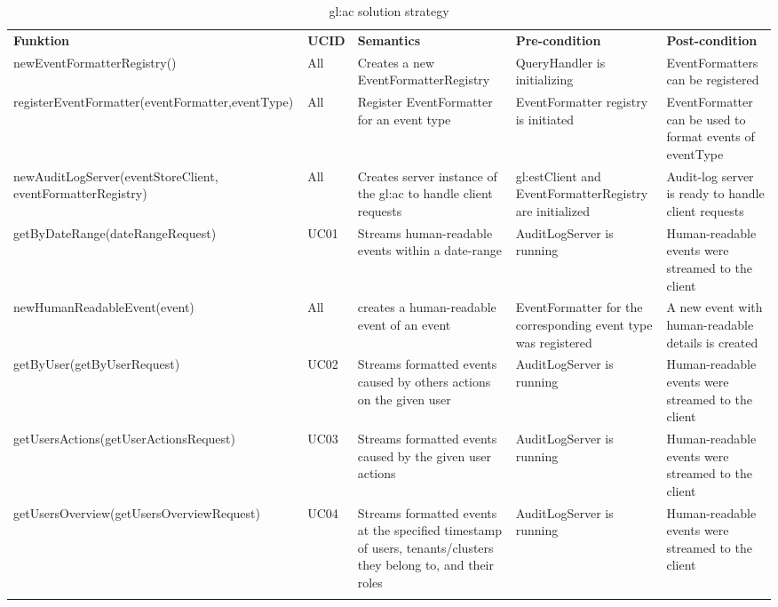 \def\arraystretch{1.5}
\begin{xltabular}[H]{\linewidth}{|X l X X X |}
  \hline
  \textbf{Funktion} & \textbf{UCID} & \textbf{Semantics} & \textbf{Pre-condition} & \textbf{Post-condition}\\
  
  new\-Event\-Formatter\-Registry\-() & All & Creates a new EventFormatterRegistry & QueryHandler is initializing & EventFormatters can be registered \\

  register\-Event\-Formatter(\-eventFormatter,\-eventType\-) & All & Register EventFormatter for an event type & EventFormatter registry is initiated & EventFormatter can be used to format events of eventType \\

  new\-Audit\-Log\-Server\-(event\-Store\-Client, event\-Formatter\-Registry) & All & Creates server instance of the \gls{gl:ac} to handle client requests & \gls{gl:est}Client and EventFormatterRegistry are initialized & Audit-log server is ready to handle client requests  \\

  get\-By\-Date\-Range(date\-Range\-Request) & UC01 & Streams human-readable events within a date-range & Audit\-Log\-Server is running & Human-readable events were streamed to the client  \\

  new\-Human\-Readable\-Event(\-event\-) & All & creates a human-readable event of an event & EventFormatter for the corresponding event type was registered & A new event with human-readable details is created \\

  get\-By\-User(get\-By\-User\-Request) & UC02 & Streams formatted events caused by others actions on the given user & Audit\-Log\-Server is running & Human-readable events were streamed to the client  \\

  get\-Users\-Actions(get\-User\-Actions\-Request) & UC03 & Streams formatted events caused by the given user actions & Audit\-Log\-Server is running & Human-readable events were streamed to the client  \\

  get\-Users\-Overview(get\-Users\-Overview\-Request) & UC04 & Streams formatted events at the specified timestamp of users, tenants/clusters they belong to, and their roles & Audit\-Log\-Server is running & Human-readable events were streamed to the client  \\

  \hline
  \caption{\gls{gl:ac} solution strategy\label{tab:acst}}\\
\end{xltabular}

